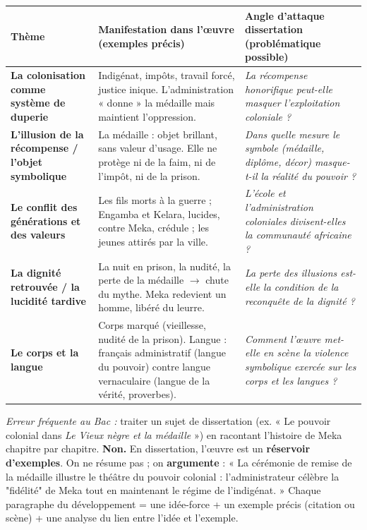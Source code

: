 \documentclass[11pt]{article}
\begin{document}
\begin{center}
\begin{tabularx}{\linewidth}{|l|X|X|}
\hline
\textbf{Thème} & \textbf{Manifestation dans l'œuvre (exemples précis)} & \textbf{Angle d'attaque dissertation (problématique possible)} \\
\hline
\textbf{La colonisation comme système de duperie} & Indigénat, impôts, travail forcé, justice inique. L'administration « donne » la médaille mais maintient l'oppression. & \emph{La récompense honorifique peut-elle masquer l'exploitation coloniale ?} \\
\hline
\textbf{L'illusion de la récompense / l'objet symbolique} & La médaille : objet brillant, sans valeur d'usage. Elle ne protège ni de la faim, ni de l'impôt, ni de la prison. & \emph{Dans quelle mesure le symbole (médaille, diplôme, décor) masque-t-il la réalité du pouvoir ?} \\
\hline
\textbf{Le conflit des générations et des valeurs} & Les fils morts à la guerre ; Engamba et Kelara, lucides, contre Meka, crédule ; les jeunes attirés par la ville. & \emph{L'école et l'administration coloniales divisent-elles la communauté africaine ?} \\
\hline
\textbf{La dignité retrouvée / la lucidité tardive} & La nuit en prison, la nudité, la perte de la médaille $\rightarrow$ chute du mythe. Meka redevient un homme, libéré du leurre. & \emph{La perte des illusions est-elle la condition de la reconquête de la dignité ?} \\
\hline
\textbf{Le corps et la langue} & Corps marqué (vieillesse, nudité de la prison). Langue : français administratif (langue du pouvoir) contre langue vernaculaire (langue de la vérité, proverbes). & \emph{Comment l'œuvre met-elle en scène la violence symbolique exercée sur les corps et les langues ?} \\
\hline
\end{tabularx}
\end{center}

\begin{attention}
\emph{Erreur fréquente au Bac :} traiter un sujet de dissertation (ex. « Le pouvoir colonial dans \emph{Le Vieux nègre et la médaille} ») en racontant l'histoire de Meka chapitre par chapitre. \textbf{Non.} En dissertation, l'œuvre est un \textbf{réservoir d'exemples}. On ne résume pas ; on \textbf{argumente} : « La cérémonie de remise de la médaille illustre le théâtre du pouvoir colonial : l'administrateur célèbre la "fidélité" de Meka tout en maintenant le régime de l'indigénat. » Chaque paragraphe du développement = une idée-force + un exemple précis (citation ou scène) + une analyse du lien entre l'idée et l'exemple.
\end{attention}
\end{document}
